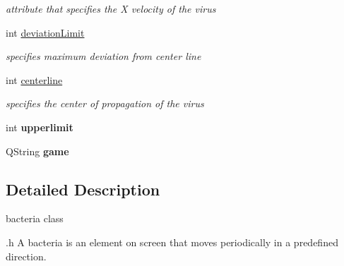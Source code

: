 \begin{DoxyCompactItemize}
\begin{DoxyCompactList}\small\item\em attribute that specifies the X velocity of the virus \end{DoxyCompactList}\item 
\hypertarget{classbacteria_aa97d75555e88a076c05dcc217b107b54}{int \hyperlink{classbacteria_aa97d75555e88a076c05dcc217b107b54}{deviation\-Limit}}\label{classbacteria_aa97d75555e88a076c05dcc217b107b54}

\begin{DoxyCompactList}\small\item\em specifies maximum deviation from center line \end{DoxyCompactList}\item 
\hypertarget{classbacteria_a512cfc4c7afef0e3bf8f76bd53072de9}{int \hyperlink{classbacteria_a512cfc4c7afef0e3bf8f76bd53072de9}{centerline}}\label{classbacteria_a512cfc4c7afef0e3bf8f76bd53072de9}

\begin{DoxyCompactList}\small\item\em specifies the center of propagation of the virus \end{DoxyCompactList}\item 
\hypertarget{classbacteria_ab7647c95c379933e91925ef1222cf05b}{int {\bfseries upperlimit}}\label{classbacteria_ab7647c95c379933e91925ef1222cf05b}

\item 
\hypertarget{classbacteria_a16f904a662cd13a7dfaf230f8e4a1436}{Q\-String {\bfseries game}}\label{classbacteria_a16f904a662cd13a7dfaf230f8e4a1436}

\end{DoxyCompactItemize}


\subsection{Detailed Description}
bacteria class 

.h A bacteria is an element on screen that moves periodically in a predefined direction. 

